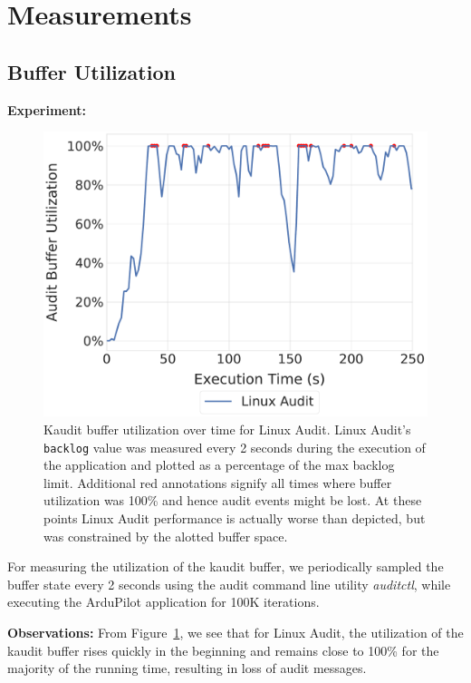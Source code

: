 \section{Measurements}


\subsection{Buffer Utilization}

\textbf{Experiment:}
\begin{figure}[tbp]
    \centering
    \includegraphics[width=0.9\linewidth,keepaspectratio,scale=0.9]{fig/backlog_over_time_hlight.pdf}
    \caption{\label{fig:eval_backlog}Kaudit buffer utilization over time for Linux Audit. Linux Audit's {\tt backlog} value was measured every 2 seconds during the execution of the application and plotted as a percentage of the max backlog limit.
    Additional red annotations signify all times where buffer utilization was 100\% and hence audit events might be lost. At these points Linux Audit performance is actually worse than depicted, but was constrained by the alotted buffer space.}    
\end{figure}

 For measuring the utilization of the kaudit buffer, we periodically sampled the buffer state every 2 seconds using the audit command line utility \textit{auditctl}, while executing the ArduPilot application for 100K iterations. 

\textbf{Observations:} From Figure~\ref{fig:eval_backlog}, we see that for Linux Audit, the utilization of the kaudit buffer rises quickly in the beginning and remains close to 100\% for the majority of the running time, resulting in loss of audit messages.

